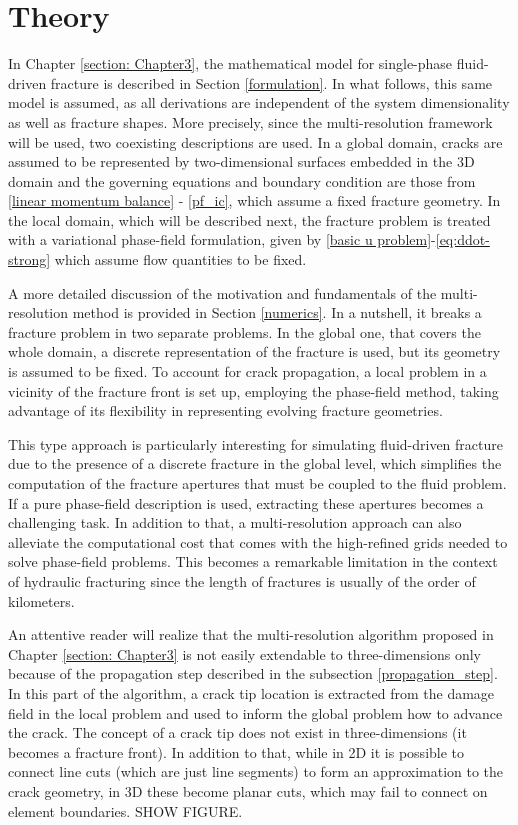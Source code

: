 \section{Theory}
\label{section: Chapter4/theory}

In Chapter \ref{section: Chapter3}, the mathematical model for single-phase fluid-driven fracture is described in Section \ref{formulation}. In what follows, this same model is assumed, as all derivations are independent of the system dimensionality as well as fracture shapes. More precisely, since the multi-resolution framework will be used, two coexisting descriptions are used. In a global domain, cracks are assumed to be represented by two-dimensional surfaces embedded in the 3D domain and the governing equations and boundary condition are those from \eqref{linear momentum balance} - \eqref{pf_ic}, which assume a fixed fracture geometry. In the local domain, which will be described next, the fracture problem is treated with a variational phase-field formulation, given by \eqref{basic u problem}-\eqref{eq:ddot-strong} which assume flow quantities to be fixed.

A more detailed discussion of the motivation and fundamentals of the multi-resolution method is provided in Section \ref{numerics}. In a nutshell, it breaks a fracture problem in two separate problems. In the global one, that covers the whole domain, a discrete representation of the fracture is used, but its geometry is assumed to be fixed. To account for crack propagation, a local problem in a vicinity of the fracture front is set up, employing the phase-field method, taking advantage of its flexibility in representing evolving fracture geometries.

This type approach is particularly interesting for simulating fluid-driven fracture due to the presence of a discrete fracture in the global level, which simplifies the computation of the fracture apertures that must be coupled to the fluid problem. If a pure phase-field description is used, extracting these apertures becomes a challenging task. In addition to that, a multi-resolution approach can also alleviate the computational cost that comes with the high-refined grids needed to solve phase-field problems. This becomes a remarkable limitation in the context of hydraulic fracturing since the length of fractures is usually of the order of kilometers.

An attentive reader will realize that the multi-resolution algorithm proposed in Chapter \ref{section: Chapter3} is not easily extendable to three-dimensions only because of the propagation step described in the subsection \ref{propagation_step}. In this part of the algorithm, a crack tip location is extracted from the damage field in the local problem and used to inform the global problem how to advance the crack. The concept of a crack tip does not exist in three-dimensions (it becomes a fracture front). In addition to that, while in 2D it is possible to connect line cuts (which are just line segments) to form an approximation to the crack geometry, in 3D these become planar cuts, which may fail to connect on element boundaries. SHOW FIGURE. 

